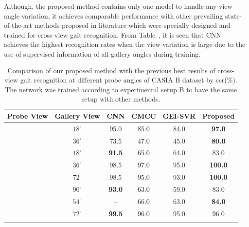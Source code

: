 Although, the proposed method contains only one model to handle any view angle variation, it achieves comparable performance with other prevailing state-of-the-art methods proposed in literature which were specially designed and trained for cross-view gait recognition. From Table~\cite{table:comp_casia_b_cross_view}, it is seen that CNN~\cite{Wu_17} achieves the highest recognition rates when the view variation is large due to the use of supervised information of all gallery angles during training.


\begin{table}
	\centering
	\caption{Comparison of our proposed method with the previous best results of cross-view gait recognition at different probe angles of CASIA B dataset by \gls{ccr}(\%). The network was trained according to experimental setup B to have the same setup with other methods. \label{table:comp_casia_b_cross_view}}
	
	{\begin{tabular*}{29pc}{c|c|cccc}\hline  \rule{0pt}{2ex}
	Probe View &Gallery View &CNN &CMCC &GEI-SVR  &\textbf{Proposed} \\ \hline\rule{0pt}{3ex}
	
	\multirow{2}{*}{$0^{\circ}$} &$18^{\circ}$ &95.0 &85.0 &84.0 &\textbf{97.0} \\\rule{0pt}{2ex}
	
					&$36^{\circ}$ &73.5 &47.0 &45.0 &\textbf{80.0} \\ \hline\rule{0pt}{3ex}
	
	
	\multirow{4}{*}{$54^{\circ}$} &$18^{\circ}$ &\textbf{91.5} &65.0 &64.0  &83.0 \\\rule{0pt}{2ex}
	
			&$36^{\circ}$ &98.5 &97.0 &95.0 &\textbf{100.0} \\\rule{0pt}{2ex}
	
			&$72^{\circ}$ &98.5 &95.0 &93.0 &\textbf{100.0} \\\rule{0pt}{2ex}
	
			&$90^{\circ}$ &\textbf{93.0} &63.0 &59.0 &83.0 \\\hline\rule{0pt}{3ex}
	
	
	\multirow{4}{*}{$90^{\circ}$} &$54^{\circ}$ &-- &66.0 &63.0 &\textbf{84.0 }\\\rule{0pt}{2ex}
	
		&$72^{\circ}$ &\textbf{99.5} &96.0 &95.0 &96.0 \\ \rule{0pt}{2ex}
	

\end{tabular*}}
\end{table}
